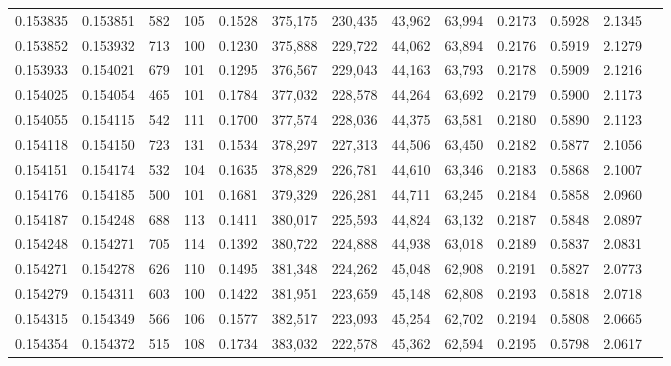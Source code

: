 \begin{tabular}{rrrrrrrrrrrrr}
0.153835 & 0.153851 &   582 & 105 &                                     0.1528 & 375,175 & 230,435 &  43,962 &  63,994 & 0.2173 & 0.5928 & 2.1345 \\
0.153852 & 0.153932 &   713 & 100 &                                     0.1230 & 375,888 & 229,722 &  44,062 &  63,894 & 0.2176 & 0.5919 & 2.1279 \\
0.153933 & 0.154021 &   679 & 101 &                                     0.1295 & 376,567 & 229,043 &  44,163 &  63,793 & 0.2178 & 0.5909 & 2.1216 \\
0.154025 & 0.154054 &   465 & 101 &                                     0.1784 & 377,032 & 228,578 &  44,264 &  63,692 & 0.2179 & 0.5900 & 2.1173 \\
0.154055 & 0.154115 &   542 & 111 &                                     0.1700 & 377,574 & 228,036 &  44,375 &  63,581 & 0.2180 & 0.5890 & 2.1123 \\
0.154118 & 0.154150 &   723 & 131 &                                     0.1534 & 378,297 & 227,313 &  44,506 &  63,450 & 0.2182 & 0.5877 & 2.1056 \\
0.154151 & 0.154174 &   532 & 104 &                                     0.1635 & 378,829 & 226,781 &  44,610 &  63,346 & 0.2183 & 0.5868 & 2.1007 \\
0.154176 & 0.154185 &   500 & 101 &                                     0.1681 & 379,329 & 226,281 &  44,711 &  63,245 & 0.2184 & 0.5858 & 2.0960 \\
0.154187 & 0.154248 &   688 & 113 &                                     0.1411 & 380,017 & 225,593 &  44,824 &  63,132 & 0.2187 & 0.5848 & 2.0897 \\
0.154248 & 0.154271 &   705 & 114 &                                     0.1392 & 380,722 & 224,888 &  44,938 &  63,018 & 0.2189 & 0.5837 & 2.0831 \\
0.154271 & 0.154278 &   626 & 110 &                                     0.1495 & 381,348 & 224,262 &  45,048 &  62,908 & 0.2191 & 0.5827 & 2.0773 \\
0.154279 & 0.154311 &   603 & 100 &                                     0.1422 & 381,951 & 223,659 &  45,148 &  62,808 & 0.2193 & 0.5818 & 2.0718 \\
0.154315 & 0.154349 &   566 & 106 &                                     0.1577 & 382,517 & 223,093 &  45,254 &  62,702 & 0.2194 & 0.5808 & 2.0665 \\
0.154354 & 0.154372 &   515 & 108 &                                     0.1734 & 383,032 & 222,578 &  45,362 &  62,594 & 0.2195 & 0.5798 & 2.0617 \\

\end{tabular}
